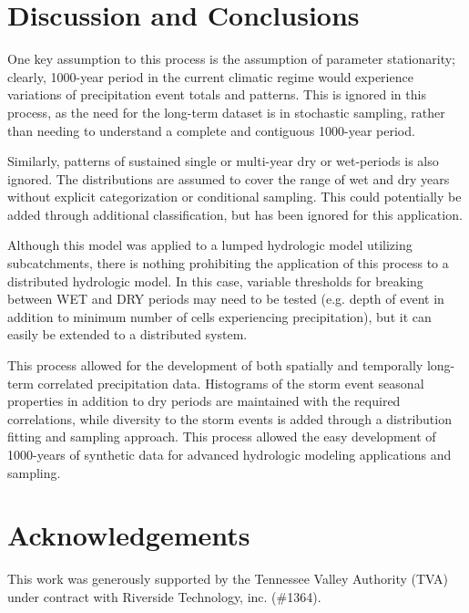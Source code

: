 \documentclass[11pt]{article} %
\begin{document}
\section{Discussion and Conclusions}

One key assumption to this process is the assumption of parameter stationarity; clearly, 1000-year period in the current climatic regime would experience variations of precipitation event totals and patterns. This is ignored in this process, as the need for the long-term dataset is in stochastic sampling, rather than needing to understand a complete and contiguous 1000-year period.

Similarly, patterns of sustained single or multi-year dry or wet-periods is also ignored. The distributions are assumed to cover the range of wet and dry years without explicit categorization or conditional sampling. This could potentially be added through additional classification, but has been ignored for this application.

Although this model was applied to a lumped hydrologic model utilizing subcatchments, there is nothing prohibiting the application of this process to a distributed hydrologic model. In this case, variable thresholds for breaking between WET and DRY periods may need to be tested (e.g. depth of event in addition to minimum number of cells experiencing precipitation), but it can easily be extended to a distributed system.

This process allowed for the development of both spatially and temporally long-term correlated precipitation data. Histograms of the storm event seasonal properties in addition to dry periods are maintained with the required correlations, while diversity to the storm events is added through a distribution fitting and sampling approach. This process allowed the easy development of 1000-years of synthetic data for advanced hydrologic modeling applications and sampling.

\section{Acknowledgements}

This work was generously supported by the Tennessee Valley Authority (TVA) under contract with Riverside Technology, inc. (\#1364). 



\end{document}
